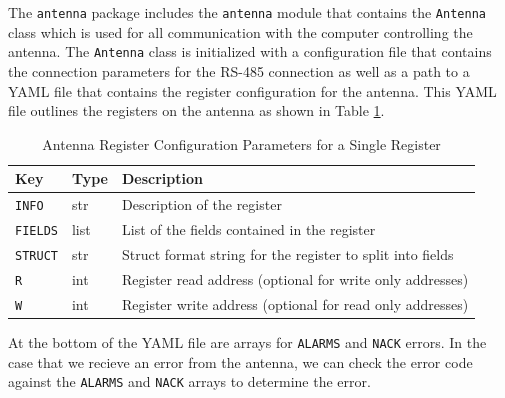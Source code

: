 The \texttt{antenna} package includes the \texttt{antenna} module that contains the \texttt{Antenna} class which is used for all communication with the computer controlling the antenna.
The \texttt{Antenna} class is initialized with a configuration file that contains the connection parameters for the RS-485 connection as well as a path to a YAML file that contains the register configuration for the antenna.
This YAML file outlines the registers on the antenna as shown in Table \ref{readout/table:antenna_regs}.

\begin{table}
    \centering
    \begin{tabularx}{\textwidth}{l|l|X}
        \textbf{Key} & \textbf{Type} & \textbf{Description} \\ \hline    
        \texttt{INFO} & str & Description of the register \\
        \texttt{FIELDS} & list & List of the fields contained in the register \\
        \texttt{STRUCT} & str & Struct format string for the register to split into fields \\
        \texttt{R} & int & Register read address (optional for write only addresses)\\
        \texttt{W} & int & Register write address (optional for read only addresses)\\
    \end{tabularx}
    \caption{Antenna Register Configuration Parameters for a Single Register}
    \label{readout/table:antenna_regs}
\end{table}

At the bottom of the YAML file are arrays for \texttt{ALARMS} and \texttt{NACK} errors. 
In the case that we recieve an error from the antenna, we can check the error code against the \texttt{ALARMS} and \texttt{NACK} arrays to determine the error.

